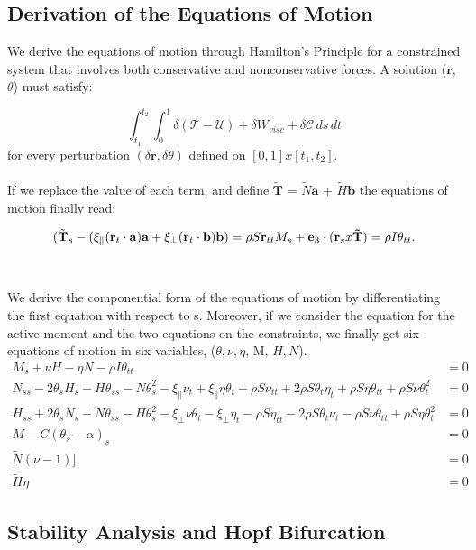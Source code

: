 \subsection{Derivation of the Equations of Motion}
We derive the equations of motion through Hamilton's Principle for a constrained system that involves both conservative and nonconservative forces. A solution ($\mathbf{r}$,$\theta$) must satisfy:

\[\int_{t_1}^{t_2} \int_{0}^{1} \delta (\mathcal{T}-\mathcal{U}) + \delta W_{visc} + \delta \mathcal{C} \, ds \,dt
\]
for every perturbation $(\delta \mathbf{r}, \delta \theta)$ defined on $[0,1]x[t_1,t_2]$. 
\\\\
If we replace the value of each term, and define $\tilde{\mathbf{T}}$ = $\tilde{N}\mathbf{a}$ + $\tilde{H}\mathbf{b}$  the equations of motion finally read:

\[ (\tilde{\mathbf{T}}_s - (\xi_\parallel (\mathbf{r}_t\cdot\mathbf{a})\mathbf{a} + \xi_\perp (\mathbf{r}_t\cdot\mathbf{b})\mathbf{b}) = \rho S \mathbf{r}_{tt}\\

M_s + \mathbf{e}_3 \cdot(\mathbf{r}_s x \mathbf{\tilde{T}}) =\rho I \theta_{tt}.
\]
\\\\
We derive the componential form of the equations of motion by differentiating the first equation with respect to s.
Moreover, if we consider the equation for the active moment and the two equations on the constraints, we finally get six equations of motion in six variables, ($\theta,\nu,\eta$, M, $\tilde{H},\tilde{N}$).
\begin{align}
M_s + \nu H -\eta N - \rho I \theta_{tt}
&= 0\\
N_{ss} - 2\theta_sH_s - H\theta_{ss}- N\theta_s^2
- \xi_{\parallel}\nu_t + \xi_{\parallel}\eta\theta_t - \rho S \nu_{tt} + 2\rho S \theta_t\eta_t + \rho S \eta\theta_{tt} + \rho S \nu\theta_t^2
&= 0\\
H_{ss} + 2\theta_sN_s + N\theta_{ss} - H\theta_s^2  - \xi_{\perp}\nu\theta_t - \xi_{\perp}\eta_t
 - \rho S \eta_{tt} - 2\rho S \theta_t\nu_t -\rho S \nu\theta_{tt} + \rho S \eta\theta_t^2
&= 0\\
M - C(\theta_s -\alpha)_s  &= 0\\
\tilde{N}(\nu - 1)] &= 0\\
\tilde{H}\eta &= 0
\end{align}

\subsection{Stability Analysis and Hopf Bifurcation}
